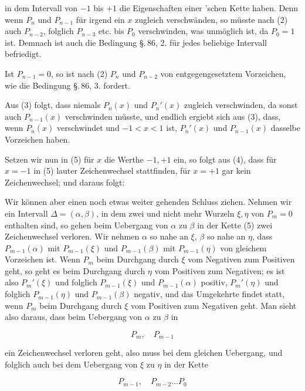 
in dem Intervall von $-1$ bis $+1$ die Eigenschaften einer 'schen Kette haben. Denn wenn $P_n$ und $P_{n-1}$ für irgend ein $x$ zugleich verschwänden, so müsste nach (2) auch $P_{n-2}$, folglich $P_{n-3}$ etc. bis $P_0$ verschwinden, was unmöglich ist, da $P_0=1$ ist. Demnach ist auch die Bedingung \S.\,86, 2. für jedes beliebige Intervall befriedigt.

Ist $P_{n-1}=0$, so ist nach (2) $P_n$ und $P_{n-2}$ von entgegengesetztem Vorzeichen, wie die Bedingung \S.\,86, 3. fordert.

Aus (3) folgt, dass niemals $P_n(x)$ und $P_n'(x)$ zugleich verschwinden, da sonst auch $P_{n-1}(x)$ verschwinden müsste, und endlich ergiebt sich aus (3), dass, wenn $P_n(x)$ verschwindet und $-1<x<1$ ist, $P_n'(x)$ und $P_{n-1}(x)$ dasselbe Vorzeichen haben.

Setzen wir nun in (5) für $x$ die Werthe $-1, +1$ ein, so folgt aus (4), dass für $x=-1$ in (5) lauter Zeichenwechsel stattfinden, für $x=+1$ gar kein Zeichenwechsel; und daraus folgt:


Wir können aber einen noch etwas weiter gehenden Schluss ziehen. Nehmen wir ein Intervall $\varDelta=(\alpha,\beta)$, in dem zwei und nicht mehr Wurzeln $\xi, \eta$ von $P_m=0$ enthalten sind, so gehen beim Uebergang von $\alpha$ zu $\beta$ in der Kette (5) zwei Zeichenwechsel verloren. Wir nehmen $\alpha$ so nahe an $\xi$, $\beta$ so nahe an $\eta$, dass $P_{m-1}(\alpha)$ mit $P_{m-1}(\xi)$ und $P_{m-1}(\beta)$ mit $P_{m-1}(\eta)$ von gleichem Vorzeichen ist. Wenn $P_m$ beim Durchgang durch $\xi$ vom Negativen zum Positiven geht, so geht es beim Durchgang durch $\eta$ vom Positiven zum Negativen; es ist also $P_m'(\xi)$ und folglich $P_{m-1}(\xi)$ und $P_{m-1}(\alpha)$ positiv, $P_m'(\eta)$ und folglich $P_{m-1}(\eta)$ und $P_{m-1}(\beta)$ negativ, und das Umgekehrte findet statt, wenn $P_m$ beim Durchgang durch $\xi$ vom Positiven zum Negativen geht. Man sieht also daraus, dass beim Uebergang von $\alpha$ zu $\beta$ in

\[
P_m, \quad P_{m-1}
\]

ein Zeichenwechsel verloren geht, also muss bei dem gleichen Uebergang, und folglich auch bei dem Uebergang von $\xi$ zu $\eta$ in der Kette

\[
P_{m-1}, \quad P_{m-2} \ldots P_0
\]
